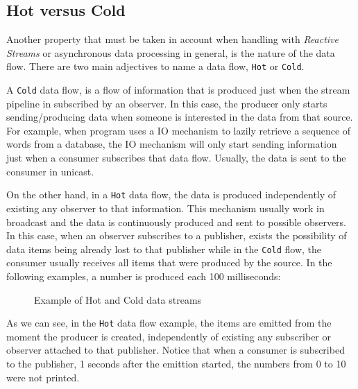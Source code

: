 	\subsection{Hot versus Cold}
	
	Another property that must be taken in account when handling with \textit{Reactive Streams} or asynchronous data processing in general, is the nature of the data flow. 
	There are two main adjectives to name a data flow, \texttt{Hot} or \texttt{Cold}. 

	A \texttt{Cold} data flow, is a flow of information that is produced just when the stream pipeline in subscribed by an observer. In this case, the producer only starts sending/producing data when someone is interested in the data from that source. 
	For example, when program uses a IO mechanism to lazily retrieve a sequence of words from a database, the IO mechanism will only start sending information just when a consumer subscribes that data flow. Usually, the data is sent to the consumer in unicast.
	
	On the other hand, in a \texttt{Hot} data flow, the data is produced independently of existing any observer to that information. This mechanism usually work in broadcast and the data is continuously produced and sent to possible observers.
	In this case, when an observer subscribes to a publisher, exists the possibility of data items being already lost to that publisher while in the \texttt{Cold} flow, the consumer usually receives all items that were produced by the source.
	In the following examples, a number is produced each 100 milliseconds:

	\begin{figure}[H]
		\centering
		\begin{subfigure}{.4\textwidth}
		 \end{subfigure}	
	\qquad\qquad
		 \begin{subfigure}{.4\textwidth}
		\end{subfigure}		
	  \caption{Example of Hot and Cold data streams}
	  \label{fig:exmplo3}
	\end{figure}

	
	As we can see, in the \texttt{Hot} data flow example, the items are emitted from the moment the producer is created, independently of existing any subscriber or observer attached to that publisher. Notice that when a consumer is subscribed to the publisher, 1 seconds after the emittion started, the numbers from 0 to 10 were not printed.
	
